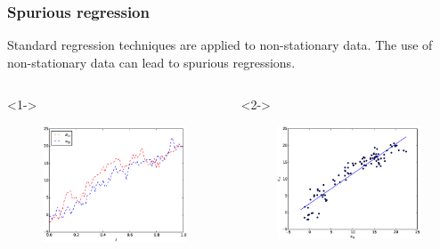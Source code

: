 \documentclass{beamer}
\begin{document}
\begin{frame}
\frametitle{Spurious regression}
Standard regression techniques are applied to non-stationary data.
The use of non-stationary data can lead to spurious regressions.  


\begin{columns}
\begin{column}{.45\linewidth}<1->
\begin{figure}
\includegraphics[width=0.4\paperwidth]{img/spurious1}
\end{figure}
\end{column}
\begin{column}{.45\linewidth}<2->
\begin{figure}
\includegraphics[width=0.4\paperwidth]{img/spurious2}

\end{figure}
\end{column}
\end{columns}
\end{frame}
\end{document}
